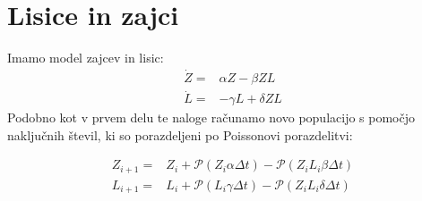 \documentclass[slovene,11pt,a4paper]{article}
\numberwithin{equation}{section} %
\numberwithin{figure}{section} %
\numberwithin{table}{section} %
\begin{document}
\clearpage
\section{Lisice in zajci}
Imamo model zajcev in lisic:
\begin{equation}
\begin{aligned}
\dot{Z}=&\alpha Z-\beta Z L \\
\dot{L} =& - \gamma L+\delta Z L
\end{aligned}
\end{equation}
Podobno kot v prvem delu te naloge računamo novo populacijo s pomočjo naključnih števil, ki so porazdeljeni po Poissonovi porazdelitvi:

\begin{equation}
\begin{aligned}
Z_{i+1}=&Z_i + \mathcal{P}(Z_i \alpha \Delta t) - \mathcal{P}(Z_i L_i \beta \Delta t) \\
L_{i+1}=&L_i + \mathcal{P}(L_i \gamma \Delta t) - \mathcal{P}(Z_i L_i \delta \Delta t)
\end{aligned}
\label{zajci-lisice-1}
\end{equation}
\end{document}
